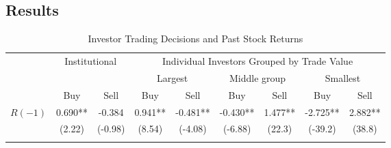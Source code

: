 \documentclass{beamer}
\begin{document}
\subsection*{Results}


\begin{frame}
    \begin{table}
        \caption{\label{tab:res}Investor Trading Decisions and Past Stock Returns}
        {\fontsize{6}{11} \selectfont
            \begin{tabular}{l*{8}{c}}
                \toprule
                                & \multicolumn{2}{c}{Institutional} & \multicolumn{6}{c}{Individual Investors Grouped by Trade Value}                                                                                                                                \\
                \cmidrule(r){4-9}
                                &                                   &                                                                 & \multicolumn{2}{c}{Largest} & \multicolumn{2}{c}{Middle group} & \multicolumn{2}{c}{Smallest}                                \\
                \cmidrule(r){2-3} \cmidrule(r){4-9}
                                & Buy                               & Sell                                                            & Buy                         & Sell                             & Buy                          & Sell    & Buy      & Sell    \\
                \midrule
                \(R(-1)\)       & 0.690**                           & -0.384                                                          & 0.941**                     & -0.481**                         & -0.430**                     & 1.477** & -2.725** & 2.882** \\
                                & (2.22)                            & (-0.98)                                                         & (8.54)                      & (-4.08)                          & (-6.88)                      & (22.3)  & (-39.2)  & (38.8)  \\
                \addlinespace


\end{tabular}}
\end{table}
\end{frame}
\end{document}
